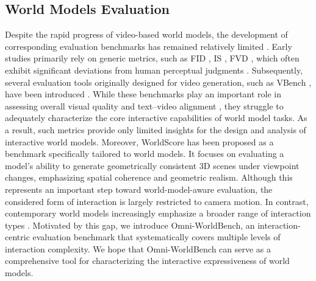 \subsection{World Models Evaluation}

Despite the rapid progress of video-based world models, the development of corresponding evaluation benchmarks has remained relatively limited \cite{ding2025understanding}. Early studies \cite{feng2024matrix,yu2025gamefactory,guo2025mineworld,chen2025finger,li2025next} primarily rely on generic metrics, such as FID \cite{heusel2017gans}, IS \cite{salimans2016improved}, FVD \cite{unterthiner2019fvd}, which often exhibit significant deviations from human perceptual judgments \cite{ding2022cogview2,otani2023toward, ling2025vmbench, wu2026imagerysearch}.
Subsequently, several evaluation tools originally designed for video generation, such as VBench \cite{huang2024vbench}, have been introduced \cite{che2024gamegen,tang2025hunyuan,ling2025vmbench,feng2025narrlv,zhu2026artifact}. While these benchmarks play an important role in assessing overall visual quality and text–video alignment \cite{liu2024survey,huang2024mmgenbench}, they struggle to adequately characterize the core interactive capabilities of world model tasks. As a result, such metrics provide only limited insights for the design and analysis of interactive world models.
Moreover, WorldScore \cite{duan2025worldscore} has been proposed as a benchmark specifically tailored to world models. It focuses on evaluating a model’s ability to generate geometrically consistent 3D scenes under viewpoint changes, emphasizing spatial coherence and geometric realism. Although this represents an important step toward world-model-aware evaluation, the considered form of interaction is largely restricted to camera motion. In contrast, contemporary world models increasingly emphasize a broader range of interaction types \cite{tang2025hunyuan,chen2025large}.
Motivated by this gap, we introduce Omni-WorldBench, an interaction-centric evaluation benchmark that systematically covers multiple levels of interaction complexity. We hope that Omni-WorldBench can serve as a comprehensive tool for characterizing the interactive expressiveness of world models.